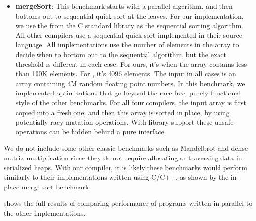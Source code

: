 \begin{itemize}
\item \textbf{mergeSort}:
  This benchmark starts with a parallel algorithm, and then bottoms out to sequential
  quick sort at the leaves.
  For our implementation, we use the  from the C standard library as
  the sequential sorting algorithm.
  All other compilers use a sequential quick sort implemented in their source language.
  All implementations use the number of elements in the array to decide when to
  bottom out to the sequential algorithm, but the exact threshold is different in each case.
  For ours, it's when the array contains less than 100K elements.
  For \MPL{}, it's 4096 elements.
  The input in all cases is an array containing 4M random floating point numbers.
  In this benchmark, we implemented optimizations that go beyond the
  race-free, purely functional style of the other benchmarks.
  For all four compilers, the input array is first copied into a fresh one,
  and then this array is sorted in place, by using potentially-racy mutation operations.
  With library support these unsafe operations can be hidden behind a pure interface.




\end{itemize}

We do not include some other classic benchmarks such as Mandelbrot and dense matrix
multiplication since they do not require allocating or traversing data in
serialized heaps.
%
With our compiler, it is likely these benchmarks would perform similarly to
their implementations written using C/C++, as shown by the in-place merge sort
benchmark.

 shows the full results of comparing performance
of programs written in parallel \ourcalc{} to the other implementations.


